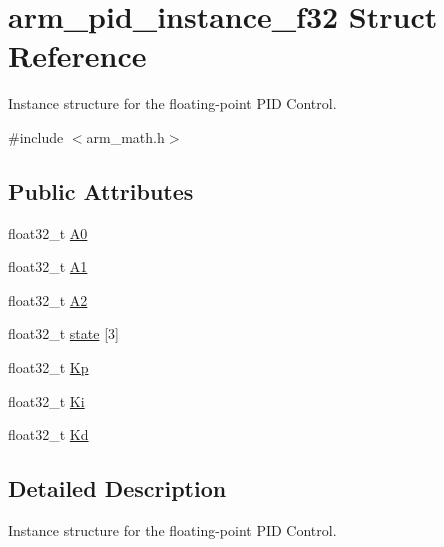 \hypertarget{structarm__pid__instance__f32}{\section{arm\-\_\-pid\-\_\-instance\-\_\-f32 Struct Reference}
\label{structarm__pid__instance__f32}
}


Instance structure for the floating-\/point P\-I\-D Control.  




{\ttfamily \#include $<$arm\-\_\-math.\-h$>$}

\subsection*{Public Attributes}
\begin{DoxyCompactItemize}
\item 
float32\-\_\-t \hyperlink{structarm__pid__instance__f32_ad7b0bed64915d0a25a3409fa2dc45556}{A0}
\item 
float32\-\_\-t \hyperlink{structarm__pid__instance__f32_a7def89571c50f7137a213326a396e560}{A1}
\item 
float32\-\_\-t \hyperlink{structarm__pid__instance__f32_a155acf642ba2f521869f19d694cd7fa0}{A2}
\item 
float32\-\_\-t \hyperlink{structarm__pid__instance__f32_afd394e1e52fb1d526aa472c83b8f2464}{state} \mbox{[}3\mbox{]}
\item 
float32\-\_\-t \hyperlink{structarm__pid__instance__f32_aa9b9aa9e413c6cec376a9dddc9f01ebe}{Kp}
\item 
float32\-\_\-t \hyperlink{structarm__pid__instance__f32_ac0feffde05fe391eeab3bf78e953830a}{Ki}
\item 
float32\-\_\-t \hyperlink{structarm__pid__instance__f32_ad5b68fbf84d16188ae4747ff91f6f088}{Kd}
\end{DoxyCompactItemize}


\subsection{Detailed Description}
Instance structure for the floating-\/point P\-I\-D Control. 

